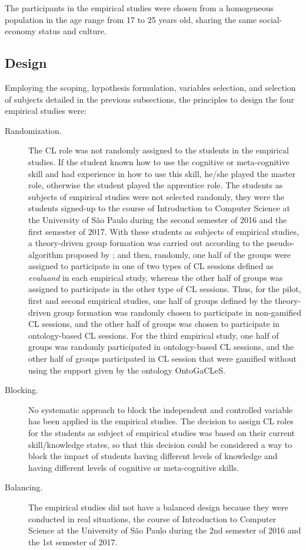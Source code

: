 The participants in the empirical studies were chosen from a homogeneous population in the age range from 17 to 25 years old, sharing the same social-economy status and culture. 

\subsection{Design}

Employing the scoping, hypothesis formulation, variables selection, and selection of subjects detailed in the previous subsections, the principles to design the four empirical studies were:

\begin{description}
\item[Randomization.] The CL role was not randomly assigned to the students in the empirical studies. If the student known how to use the cognitive or meta-cognitive skill and had experience in how to use this skill, he/she played the master role, otherwise the student played the apprentice role. The students as subjects of empirical studies were not selected randomly, they were the students signed-up to the course of Introduction to Computer Science at the University of São Paulo during the second semester of 2016 and the first semester of 2017. With these students as subjects of empirical studies, a theory-driven group formation was carried out according to the pseudo-algorithm proposed by ; and then, randomly, one half of the groups were assigned to participate in one of two types of CL sessions defined as \emph{evaluand} in each empirical study, whereas the other half of groups was assigned to participate in the other type of CL sessions. Thus, for the pilot, first and second empirical studies, one half of groups defined by the theory-driven group formation was randomly chosen to participate in non-gamified CL sessions, and the other half of groups was chosen to participate in ontology-based CL sessions.
For the third empirical study, one half of groups was randomly participated in ontology-based CL sessions, and the other half of groups participated in CL session that were gamified without using the support given by the ontology OntoGaCLeS.

\item[Blocking.] No systematic approach to block the independent and controlled variable has been applied in the empirical studies. The decision to assign CL roles for the students as subject of empirical studies was based on their current skill/knowledge states, so that this decision could be considered a way to block the impact of students having different levels of knowledge and having different levels of cognitive or meta-cognitive skills. 
 
\item[Balancing.] The empirical studies did not have a balanced design because they were conducted in real situations, the course of Introduction to Computer Science at the University of São Paulo during the 2nd semester of 2016 and the 1st semester of 2017.
\end{description}

